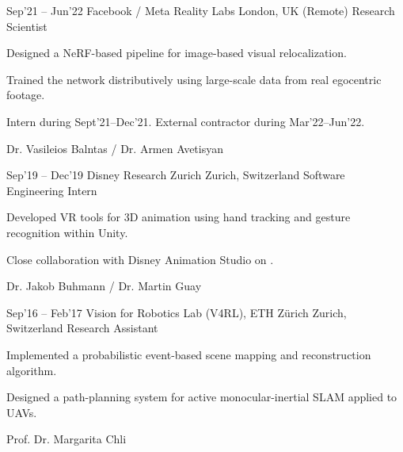 \documentclass[11pt,a4paper,sans]{moderncv} %
\begin{document}
\WorkExperience
{Sep'21 -- Jun'22}
{Facebook / Meta Reality Labs}
{London, UK (Remote)}
{Research Scientist}
{
\item Designed a NeRF-based pipeline for image-based visual relocalization.
\item Trained the network distributively using large-scale data from real egocentric footage.
\item Intern during Sept'21--Dec'21. External contractor during Mar'22--Jun'22.			
}
{Dr. Vasileios Balntas / Dr. Armen Avetisyan}


\WorkExperience
{Sep'19 -- Dec'19}
{Disney Research Zurich}
{Zurich, Switzerland}
{Software Engineering Intern}
{
	\item Developed VR tools for 3D animation using hand tracking and gesture recognition within Unity.
	\item Close collaboration with Disney Animation Studio on .	
}
{Dr. Jakob Buhmann / Dr. Martin Guay}


\WorkExperience
{Sep'16 -- Feb'17}
{Vision for Robotics Lab (V4RL), ETH Z\"urich}
{Zurich, Switzerland}
{Research Assistant}
{
	\item Implemented a probabilistic event-based scene mapping and reconstruction algorithm.
	\item Designed a path-planning system for active monocular-inertial SLAM applied to UAVs.
}
{Prof. Dr. Margarita Chli}








\end{document}
